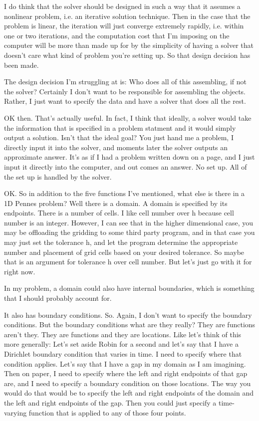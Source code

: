 \documentclass{amsart}
\begin{document}
I do think that the solver should be designed in such a way that it assumes a
nonlinear problem, i.e. an iterative solution technique. Then in the case that
the problem is linear, the iteration will just converge extremely rapidly, i.e.
within one or two iterations, and the computation cost that I'm imposing on the
computer will be more than made up for by the simplicity of having a solver
that doesn't care what kind of problem you're setting up. So that design
decision has been made. 

The design decision I'm struggling at is: Who does all of this assembling, if
not the solver? Certainly I don't want to be responsible for assembling the
objects. Rather, I just want to specify the data and have a solver that does
all the rest. 

OK then. That's actually useful. In fact, I think that ideally, a solver would
take the information that is specified in a problem statment and it would
simply output a solution. Isn't that the ideal goal? You just hand me a
problem, I directly input it into the solver, and moments later the solver
outputs an approximate answer. It's as if I had a problem written down on a
page, and I just input it directly into the computer, and out comes an answer.
No set up. All of the set up is handled by the solver. 

OK. So in addition to the five functions I've mentioned, what else is there in
a 1D Pennes problem? Well there is a domain. A domain is specified by its
endpoints. There is a number of cells. I like cell number over h because cell
number is an integer. However, I can see that in the higher dimensional case,
you may be offloading the gridding to some third party program, and in that
case you may just set the tolerance h, and let the program determine the
appropriate number and placement of grid cells based on your desired tolerance.
So maybe that is an argument for tolerance h over cell number. But let's just
go with it for right now. 

In my problem, a domain could also have internal boundaries, which is something
that I should probably account for. 

It also has boundary conditions. So. Again, I don't want to specify the
boundary conditions. But the boundary conditions what are they really? They are
functions aren't they. They are functions and they are locations. Like let's
think of this more generally: Let's set aside Robin for a second and let's say
that I have a Dirichlet boundary condition that varies in time. I need to
specify where that condition applies. Let's say that I have a gap in my domain
as I am imagining. Then on paper, I need to specify where the left and right
endpoints of that gap are, and I need to specify a boundary condition on those
locations. The way you would do that would be to specify the left and right
endpoints of the domain and the left and right endpoints of the gap. Then you
could just specify a time-varying function that is applied to any of those four
points. 
\end{document}
